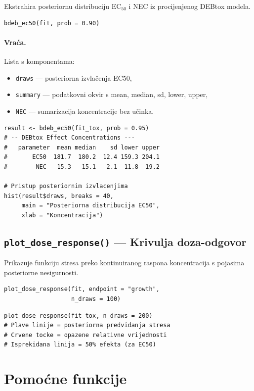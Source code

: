 \documentclass[11pt,a4paper]{article}
\newcommand{\fn}[1]{\texttt{#1()}}
\newcommand{\code}[1]{\texttt{#1}}
\begin{document}
Ekstrahira posteriornu distribuciju $\text{EC}_{50}$ i NEC iz procijenjenog
DEBtox modela.

\begin{lstlisting}
bdeb_ec50(fit, prob = 0.90)
\end{lstlisting}

\paragraph{Vraća.} Lista s komponentama:
\begin{itemize}[nosep]
  \item \code{draws} --- posteriorna izvlačenja EC50,
  \item \code{summary} --- podatkovni okvir s mean, median, sd, lower, upper,
  \item \code{NEC} --- sumarizacija koncentracije bez učinka.
\end{itemize}

\begin{lstlisting}
result <- bdeb_ec50(fit_tox, prob = 0.95)
# -- DEBtox Effect Concentrations ---
#   parameter  mean median    sd lower upper
#       EC50  181.7  180.2  12.4 159.3 204.1
#        NEC   15.3   15.1   2.1  11.8  19.2

# Pristup posteriornim izvlacenjima
hist(result$draws, breaks = 40,
     main = "Posteriorna distribucija EC50",
     xlab = "Koncentracija")
\end{lstlisting}


\subsection{\fn{plot\_dose\_response} --- Krivulja doza-odgovor}

Prikazuje funkciju stresa preko kontinuiranog raspona koncentracija s
pojasima posteriorne nesigurnosti.

\begin{lstlisting}
plot_dose_response(fit, endpoint = "growth",
                   n_draws = 100)
\end{lstlisting}

\begin{lstlisting}
plot_dose_response(fit_tox, n_draws = 200)
# Plave linije = posteriorna predvidanja stresa
# Crvene tocke = opazene relativne vrijednosti
# Isprekidana linija = 50% efekta (za EC50)
\end{lstlisting}


\section{Pomoćne funkcije}
\label{sec:pomocne}
\end{document}
